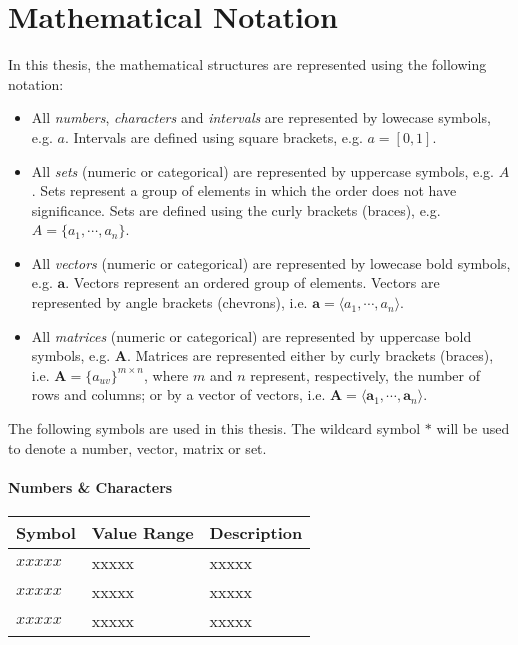 
\chapter*{Mathematical Notation}

\markright{\MakeUppercase{\nomname}}

In this thesis, the mathematical structures are represented using the following notation:
\begin{itemize}
\item All \emph{numbers}, \emph{characters} and \emph{intervals} are represented by lowecase symbols, e.g. $a$. Intervals are defined using square brackets, e.g. $a = [0,1]$.
\item All \emph{sets} (numeric or categorical) are represented by uppercase symbols, e.g. $A$. Sets represent a group of elements in which the order does not have significance. Sets are defined using the curly brackets (braces), e.g. $A = \{a_1, \cdots, a_n \}$.
\item All \emph{vectors} (numeric or categorical) are represented by lowecase bold symbols, e.g. $\mathbf{a}$. Vectors represent an ordered group of elements. Vectors are represented by angle brackets (chevrons), i.e. $\mathbf{a} = \langle a_1, \cdots, a_n \rangle$.
\item All \emph{matrices} (numeric or categorical) are represented by uppercase bold symbols, e.g. $\mathbf{A}$. Matrices are represented either by curly brackets (braces), i.e. $\mathbf{A} = {\{a_{uv}\}}^{m \times n}$, where $m$ and $n$ represent, respectively, the number of rows and columns; or by a vector of vectors, i.e. $\mathbf{A} = \langle \mathbf{a}_1, \cdots, \mathbf{a}_n \rangle$.
\end{itemize}

\noindent
The following symbols are used in this thesis. The wildcard symbol $\ast$ will be used to denote a number, vector, matrix or set.

\subsubsection{Numbers \& Characters}

\begin{longtable}{>{\raggedright\arraybackslash}p{1cm}>{\raggedright\arraybackslash}p{4cm}>{\raggedright\arraybackslash}p{9cm}}

  \hline

  \textbf{Symbol} & \textbf{Value Range} & \textbf{Description} \\

  \hline

  $xxxxx$ & xxxxx & xxxxx \\

  $xxxxx$ & xxxxx & xxxxx \\

  $xxxxx$ & xxxxx & xxxxx \\

  \hline

\end{longtable}


